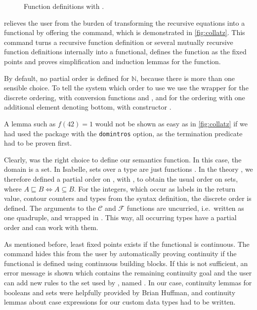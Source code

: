 \documentclass[a4paper,halfparskip,DIV=10,11pt]{scrbook}
\newcommand{\C}{\mathcal C}
\newcommand{\F}{\mathcal F}
\newcommand{\N}{\mathds N}
\begin{document}
\begin{figure}
\begin{framed}

\end{framed}
\caption{Function definitions with .}
\label{fig:collatz}
\end{figure}

 relieves the user from the burden of transforming the recursive equations into a functional by offering the  command, which is demonstrated in \vref{fig:collatz}. This command turns a recursive function definition or several mutually recursive function definitions internally into a functional, defines the function as the fixed points and proves simplification and induction lemmas for the function.

By default, no partial order is defined for $\N$, because there is more than one sensible choice. To tell the system which order to use we use the wrapper  for the discrete ordering, with conversion functions  and , and  for the ordering with one additional element denoting bottom, with constructor .

A lemma such as $f(42)=1$ would not be shown as easy as in \vref{fig:collatz} if we had used the  package with the \texttt{domintros} option, as the termination predicate had to be proven first.

Clearly,  was the right choice to define our semantics function. In this case, the domain is a set. In Isabelle, sets over a type  are just functions . In the theory , we therefore defined a partial order on , with , to obtain the usual order on sets, where $A \sqsubseteq B \iff A \subseteq B$. For the integers, which occur as labels in the return value, contour counters and types from the syntax definition, the discrete order is defined. The arguments to the $\C$ and $\F$ functions are uncurried, i.e.\ written as one quadruple, and wrapped in . This way, all occurring types have a partial order and  can work with them.

As mentioned before, least fixed points exists if the functional is continuous. The  command hides this from the user by automatically proving continuity if the functional is defined using continuous building blocks. If this is not sufficient, an error message is shown which contains the remaining continuity goal and the user can add new rules to the set used by , named . In our case, continuity lemmas for booleans and sets were helpfully provided by Brian Huffman, and continuity lemmas about case expressions for our custom data types had to be written.
\end{document}
